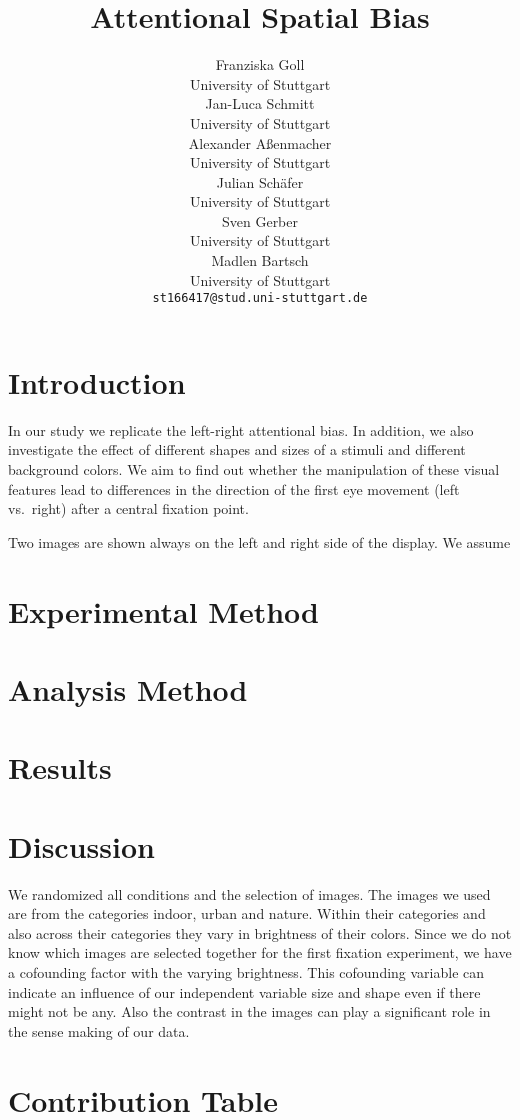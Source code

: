 \documentclass[
]{article}
\title{Attentional Spatial Bias}
\author{
  \begin{minipage}[t]{0.28\textwidth}
    \centering
    Franziska Goll\par
        \textnormal\small{University of Stuttgart}\par
        
  \end{minipage}%
  \hspace{0.05\textwidth} %
  \begin{minipage}[t]{0.28\textwidth}
    \centering
    Jan-Luca Schmitt\par
        \textnormal\small{University of Stuttgart}\par
        
  \end{minipage}%
  \hspace{0.05\textwidth} %
  \begin{minipage}[t]{0.28\textwidth}
    \centering
    Alexander Aßenmacher\par
        \textnormal\small{University of Stuttgart}\par
        
  \end{minipage}%
  \hspace{0.05\textwidth} %
  \begin{minipage}[t]{0.28\textwidth}
    \centering
    Julian Schäfer\par
        \textnormal\small{University of Stuttgart}\par
        
  \end{minipage}%
  \hspace{0.05\textwidth} %
  \begin{minipage}[t]{0.28\textwidth}
    \centering
    Sven Gerber\par
        \textnormal\small{University of Stuttgart}\par
        
  \end{minipage}%
  \hspace{0.05\textwidth} %
  \begin{minipage}[t]{0.28\textwidth}
    \centering
    Madlen Bartsch\par
        \textnormal\small{University of Stuttgart}\par
        \small\texttt{st166417@stud.uni-stuttgart.de}
  \end{minipage}%
  \hspace{0.05\textwidth} %
}
\date{}
\begin{document}
\maketitle


\section{Introduction}\label{introduction}

In our study we replicate the left-right attentional bias. In addition,
we also investigate the effect of different shapes and sizes of a
stimuli and different background colors. We aim to find out whether the
manipulation of these visual features lead to differences in the
direction of the first eye movement (left vs.~right) after a central
fixation point.

Two images are shown always on the left and right side of the display.
We assume

\section{Experimental Method}\label{experimental-method}

\section{Analysis Method}\label{analysis-method}

\section{Results}\label{results}

\section{Discussion}\label{discussion}

We randomized all conditions and the selection of images. The images we
used are from the categories indoor, urban and nature. Within their
categories and also across their categories they vary in brightness of
their colors. Since we do not know which images are selected together
for the first fixation experiment, we have a cofounding factor with the
varying brightness. This cofounding variable can indicate an influence
of our independent variable size and shape even if there might not be
any. Also the contrast in the images can play a significant role in the
sense making of our data.

\section{Contribution Table}\label{contribution-table}
\end{document}
